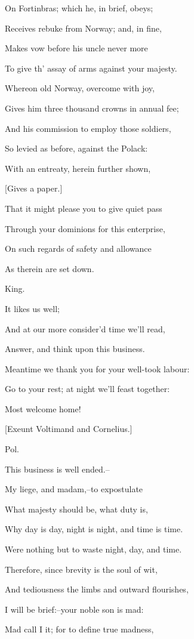 \documentclass[12pt]{book}
\begin{document}
On Fortinbras; which he, in brief, obeys;

Receives rebuke from Norway; and, in fine,

Makes vow before his uncle never more

To give th' assay of arms against your majesty.

Whereon old Norway, overcome with joy,

Gives him three thousand crowns in annual fee;

And his commission to employ those soldiers,

So levied as before, against the Polack:

With an entreaty, herein further shown,

[Gives a paper.]

That it might please you to give quiet pass

Through your dominions for this enterprise,

On such regards of safety and allowance

As therein are set down.



King.

It likes us well;

And at our more consider'd time we'll read,

Answer, and think upon this business.

Meantime we thank you for your well-took labour:

Go to your rest; at night we'll feast together:

Most welcome home!



[Exeunt Voltimand and Cornelius.]



Pol.

This business is well ended.--

My liege, and madam,--to expostulate

What majesty should be, what duty is,

Why day is day, night is night, and time is time.

Were nothing but to waste night, day, and time.

Therefore, since brevity is the soul of wit,

And tediousness the limbs and outward flourishes,

I will be brief:--your noble son is mad:

Mad call I it; for to define true madness,
\end{document}
